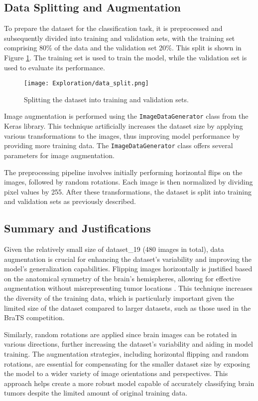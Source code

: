 \subsection{Data Splitting and Augmentation}\label{data_split_augmentation}
To prepare the dataset for the classification task, it is preprocessed and subsequently divided into training and validation sets, with the training set comprising 80\% of the data and the validation set 20\%. This split is shown in Figure \ref{fig:data_split}. The training set is used to train the model, while the validation set is used to evaluate its performance.

\begin{figure}[H]
  \begin{center}
    \texttt{[image: Exploration/data\_split.png]}
  \end{center}
  \caption{Splitting the dataset into training and validation sets.}\label{fig:data_split}
\end{figure}

Image augmentation is performed using the \texttt{ImageDataGenerator} class from the Keras library. This technique artificially increases the dataset size by applying various transformations to the images, thus improving model performance by providing more training data. The \texttt{ImageDataGenerator} class offers several parameters for image augmentation.

The preprocessing pipeline involves initially performing horizontal flips on the images, followed by random rotations. Each image is then normalized by dividing pixel values by 255. After these transformations, the dataset is split into training and validation sets as previously described.

\subsection{Summary and Justifications}

Given the relatively small size of dataset\_19 (480 images in total), data augmentation is crucial for enhancing the dataset's variability and improving the model's generalization capabilities. Flipping images horizontally is justified based on the anatomical symmetry of the brain's hemispheres, allowing for effective augmentation without misrepresenting tumor locations \cite{nalepa_data_2019}. This technique increases the diversity of the training data, which is particularly important given the limited size of the dataset compared to larger datasets, such as those used in the BraTS competition.

Similarly, random rotations are applied since brain images can be rotated in various directions, further increasing the dataset's variability and aiding in model training. The augmentation strategies, including horizontal flipping and random rotations, are essential for compensating for the smaller dataset size by exposing the model to a wider variety of image orientations and perspectives. This approach helps create a more robust model capable of accurately classifying brain tumors despite the limited amount of original training data.

